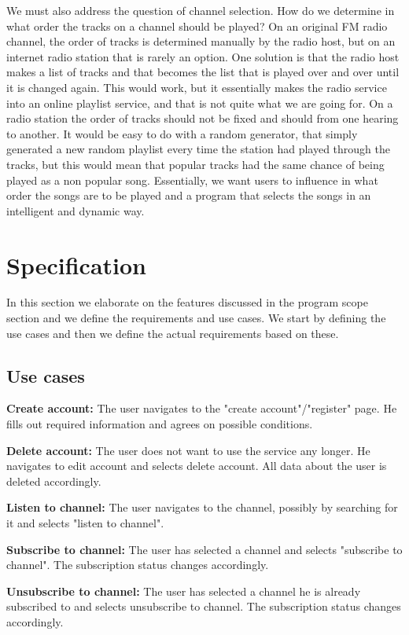 \documentclass[a4paper,11pt,report]{article}
\begin{document}
{We must also address the question of channel selection. How do we determine in what order the tracks on a channel should be played? On an original FM radio channel, the order of tracks is determined manually by the radio host, but on an internet radio station that is rarely an option. One solution is that the radio host makes a list of tracks and that becomes the list that is played over and over until it is changed again. This would work, but it essentially makes the radio service into an online playlist service, and that is not quite what we are going for. On a radio station the order of tracks should not be fixed and should from one hearing to another. It would be easy to do with a random generator, that simply generated a new random playlist every time the station had played through the tracks, but this would mean that popular tracks had the same chance of being played as a non popular song. Essentially, we want users to influence in what order the songs are to be played and a program that selects the songs in an intelligent and dynamic way. 

\section{Specification}
In this section we elaborate on the features discussed in the program scope section and we define the requirements and use cases. We start by defining the use cases and then we define the actual requirements based on these. 
\subsection{Use cases}
\textbf{Create account:}
The user navigates to the "create account"/"register" page. He fills out required information and agrees on possible conditions.

\textbf{Delete account:}
The user does not want to use the service any longer. He navigates to edit account and selects delete account. All data about the user is deleted accordingly.

\textbf{Listen to channel:}
The user navigates to the channel, possibly by searching for it and selects "listen to channel".

\textbf{Subscribe to channel:}
The user has selected a channel and selects "subscribe to channel". The subscription status changes accordingly.

\textbf{Unsubscribe to channel:}
The user has selected a channel he is already subscribed to and selects unsubscribe to channel. The subscription status changes accordingly.

}
\end{document}
